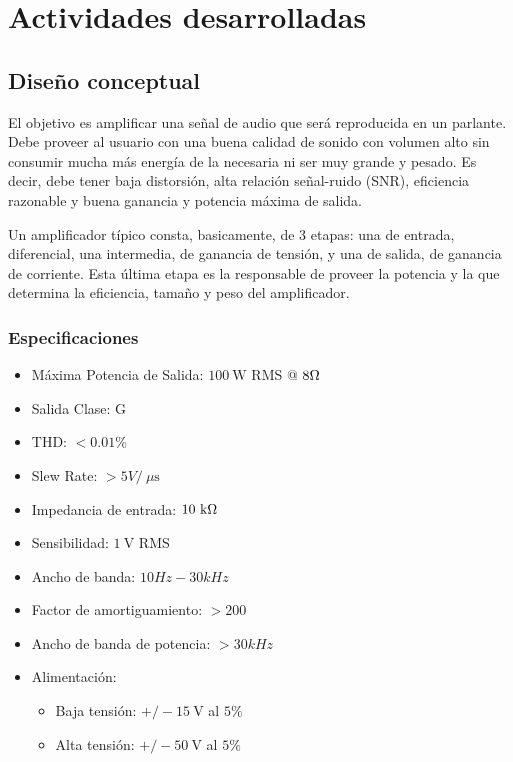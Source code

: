\documentclass[a4paper,12pt,twoside]{article}
\newcommand{\volt}{\ensuremath{~\mathrm{V}}}
\newcommand{\kohm}{\ensuremath{~\mathrm{k}\ohm}}
\newcommand{\uS}{\ensuremath{~\mu\mathrm{s}}}
\newcommand{\watt}{\ensuremath{~\mathrm{W}}}
\begin{document}


\newpage
\vfill
\tableofcontents
\vfill

\listoffixmes

\newpage

\section{Actividades desarrolladas}

\subsection{Diseño conceptual}



El objetivo es amplificar una señal de audio que será reproducida en un parlante.  Debe proveer al usuario con una buena calidad de sonido con volumen alto sin consumir mucha más energía de la necesaria ni ser muy grande y pesado. Es decir, debe tener baja distorsión, alta relación señal-ruido (SNR), eficiencia razonable y buena ganancia y potencia máxima de salida.

Un amplificador típico consta, basicamente, de 3 etapas: una de entrada, diferencial,  una intermedia, de ganancia de tensión, y una de salida, de ganancia de corriente. Esta última etapa es la responsable de proveer la potencia y la que determina la eficiencia, tamaño y peso del amplificador. 

\subsubsection{Especificaciones}

\bigskip

\begin{itemize}
	\item Máxima Potencia de Salida:  $100\watt$ RMS @ $8\ohm$
	\item Salida Clase: G
	\item THD: $< 0.01 \%$  %
	\item Slew Rate: $>5V / \uS$
	\item Impedancia de entrada: $10\kohm$
	\item Sensibilidad: $1\volt$ RMS
	\item Ancho de banda: $10 Hz-30kHz$
	\item Factor de amortiguamiento: $>200$
	\item Ancho de banda de potencia: $>30kHz$
	\item Alimentación: 
	\begin{itemize}
		\item Baja tensión: $ +/-15\volt$ al $5\%$
		\item Alta tensión: $ +/-50\volt$ al $5\%$
	\end{itemize}
\end{itemize}
\end{document}

